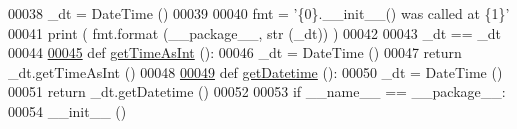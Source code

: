 \begin{DoxyCode}
00038     \_dt = DateTime ()
00039     
00040     fmt = \textcolor{stringliteral}{'\{0\}.\_\_init\_\_() was called at \{1\}'}
00041     \textcolor{keywordflow}{print} ( fmt.format (\_\_package\_\_, str (\_dt)) )  
00042     
00043     \_dt == \_dt
00044     
\hyperlink{namespacestart__time_a822927985dec03d75bfdf136d6ac6a97}{00045} \textcolor{keyword}{def }\hyperlink{namespacestart__time_a822927985dec03d75bfdf136d6ac6a97}{getTimeAsInt} ():
00046     \_dt = DateTime ()
00047     \textcolor{keywordflow}{return} \_dt.getTimeAsInt ()
00048 
\hyperlink{namespacestart__time_a52171f611eeff20ff03fd88c834220b0}{00049} \textcolor{keyword}{def }\hyperlink{namespacestart__time_a52171f611eeff20ff03fd88c834220b0}{getDatetime} ():
00050     \_dt = DateTime ()
00051     \textcolor{keywordflow}{return} \_dt.getDatetime ()
00052 
00053 \textcolor{keywordflow}{if} \_\_name\_\_ == \_\_package\_\_:
00054     \_\_init\_\_ ()
\end{DoxyCode}
